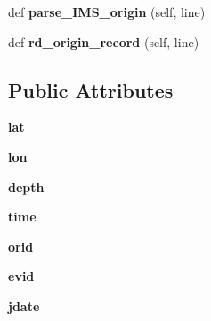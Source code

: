 \begin{DoxyCompactItemize}
\item 
\hypertarget{classcss__types_1_1origin30_a01a7828bc6408b50e42e59ede9b4f9e4}{}def {\bfseries parse\+\_\+\+I\+M\+S\+\_\+origin} (self, line)\label{classcss__types_1_1origin30_a01a7828bc6408b50e42e59ede9b4f9e4}

\item 
\hypertarget{classcss__types_1_1origin30_a3ba0cf0dd3d75c0b16c34e194d7364cc}{}def {\bfseries rd\+\_\+origin\+\_\+record} (self, line)\label{classcss__types_1_1origin30_a3ba0cf0dd3d75c0b16c34e194d7364cc}

\end{DoxyCompactItemize}
\subsection*{Public Attributes}
\begin{DoxyCompactItemize}
\item 
\hypertarget{classcss__types_1_1origin30_a7b4ff896f73a1fb80af9c2eaf94b8b2e}{}{\bfseries lat}\label{classcss__types_1_1origin30_a7b4ff896f73a1fb80af9c2eaf94b8b2e}

\item 
\hypertarget{classcss__types_1_1origin30_a6102cd7f02639662328f26617759cd7e}{}{\bfseries lon}\label{classcss__types_1_1origin30_a6102cd7f02639662328f26617759cd7e}

\item 
\hypertarget{classcss__types_1_1origin30_a672df0530d2f9c6b1a32e10eaaa3b454}{}{\bfseries depth}\label{classcss__types_1_1origin30_a672df0530d2f9c6b1a32e10eaaa3b454}

\item 
\hypertarget{classcss__types_1_1origin30_a0889a2a34febb23fb3a349d82792c77a}{}{\bfseries time}\label{classcss__types_1_1origin30_a0889a2a34febb23fb3a349d82792c77a}

\item 
\hypertarget{classcss__types_1_1origin30_a4cf3002dbdb0f25b253ed55d1648ede6}{}{\bfseries orid}\label{classcss__types_1_1origin30_a4cf3002dbdb0f25b253ed55d1648ede6}

\item 
\hypertarget{classcss__types_1_1origin30_a71de40c6289d4f308cf2ad8c5b82bc76}{}{\bfseries evid}\label{classcss__types_1_1origin30_a71de40c6289d4f308cf2ad8c5b82bc76}

\item 
\hypertarget{classcss__types_1_1origin30_a1ad8cefd815656e41c4fd07d60ae7c04}{}{\bfseries jdate}\label{classcss__types_1_1origin30_a1ad8cefd815656e41c4fd07d60ae7c04}


\end{DoxyCompactItemize}
